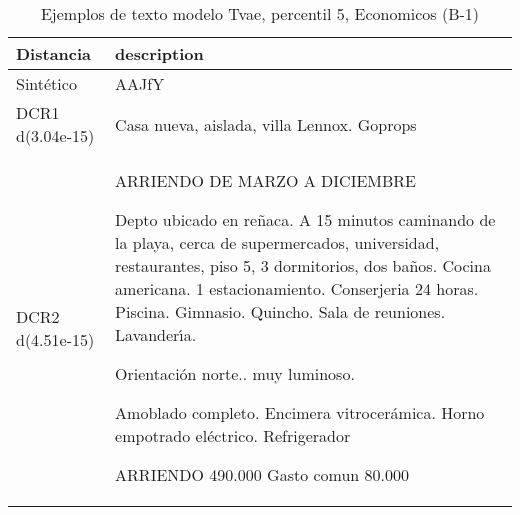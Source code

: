 \begin{table}[H]
\centering
\fontsize{10}{14}\selectfont
\caption{Ejemplos de texto modelo Tvae, percentil 5, Economicos (B-1)}
\label{table-example-economicos-b-1-tvae-5p-text}
\begin{tabular}{|l|m{35em}|}
\hline
\rowcolor[gray]{0.8}
Distancia & description \\
\hline Sintético & AAJfY \\
\hline DCR1 d(3.04e-15) & Casa nueva, aislada, villa Lennox. Goprops \\
\hline DCR2 d(4.51e-15) & ARRIENDO DE MARZO A DICIEMBRE

Depto ubicado en re\~naca. A 15 minutos caminando de la playa, cerca de supermercados, universidad, restaurantes, piso 5, 3 dormitorios, dos ba\~nos. Cocina americana. 1 estacionamiento. Conserjeria 24 horas. Piscina. Gimnasio. Quincho. Sala de reuniones. Lavander{\'\i}a.

Orientaci\'on norte.. muy luminoso.

Amoblado completo. Encimera vitrocer\'amica. Horno empotrado el\'ectrico. Refrigerador

ARRIENDO 490.000
Gasto comun 80.000 \\
\hline
\end{tabular}
\end{table}
